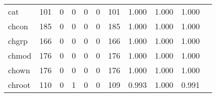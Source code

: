 \begin{longtable}{lp{1.2cm}p{1.2cm}p{1.2cm}p{1.2cm}p{1.2cm}p{1.2cm}p{1.2cm}p{1.2cm}p{1.2cm}p{1.2cm}}
cat       &                                   101 &                                                  0 &                                                  0 &                                                  0 &                                                  0 &                                                101 &                                         1.000 &                                              1.000 &                                              1.000 \\
chcon     &                                   185 &                                                  0 &                                                  0 &                                                  0 &                                                  0 &                                                185 &                                         1.000 &                                              1.000 &                                              1.000 \\
chgrp     &                                   166 &                                                  0 &                                                  0 &                                                  0 &                                                  0 &                                                166 &                                         1.000 &                                              1.000 &                                              1.000 \\
chmod     &                                   176 &                                                  0 &                                                  0 &                                                  0 &                                                  0 &                                                176 &                                         1.000 &                                              1.000 &                                              1.000 \\
chown     &                                   176 &                                                  0 &                                                  0 &                                                  0 &                                                  0 &                                                176 &                                         1.000 &                                              1.000 &                                              1.000 \\
chroot    &                                   110 &                                                  0 &                                                  1 &                                                  0 &                                                  0 &                                                109 &                                         0.993 &                                              1.000 &                                              0.991 \\

\end{longtable}
